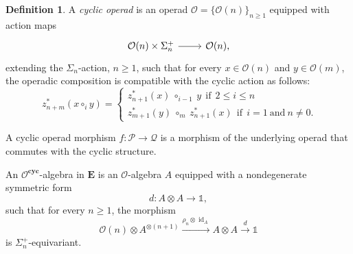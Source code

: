 \documentclass{amsart}
\newcommand{\bE}{\mathbf{E}}
\newcommand{\calO}{\mathcal{O}}
\newcommand{\calQ}{\mathcal{Q}}
\newcommand{\calP}{\mathcal{P}}
\newcommand{\cyc}{\mathbf{cyc}}
\newcommand{\id}{\operatorname{id}}
\newcommand{\End}{\operatorname{End}}
\newcommand{\Hom}{\operatorname{Hom}}
\newcommand{\lrar}{\ensuremath{\longrightarrow}}
\theoremstyle{definition}
\newtheorem{definition}[theorem]{Definition}%
\numberwithin{equation}{section}
\begin{document}


\begin{definition}\label{def: cyclic operad}
A \emph{cyclic operad} is an operad $\calO=\{\calO(n)\}_{n\geq 1}$ equipped with action maps \[\begin{tikzcd}\calO(n)\times\Sigma_{n}^{+}\arrow[r, ""]& \calO(n), \end{tikzcd}\] extending the $\Sigma_n$-action, $n\geq 1$, such that for every $x\in\calO(n)$ and $y\in\calO(m)$, the operadic composition is compatible with the cyclic action as follows: 
\begin{equation} ~\label{cylic_formula}
      z_{n+m}^*(x\circ_i y)  =  \begin{cases} z_{n+1}^*(x)\ \circ_{i-1}\ y \ \ \text{if} \ \ 2\leq i\leq n \\
      z_{m+1}^*(y) \ \circ_m \ z_{n+1}^*(x) \ \ \text{if} \ \ i=1 \ \text{and} \ n\not=0. 
      \end{cases}
\end{equation}   
\end{definition}
A cyclic operad morphism $f: \calP \lrar \calQ$ is a morphism of the underlying operad that commutes with the cyclic structure. 

An $\calO^{\cyc}$-algebra in $\bE$ is an $\calO$-algebra $A$ equipped with a nondegenerate symmetric form
\[
d:A\otimes A\to \mathbb{1},
\]
such that for every $n\geq 1$, the morphism
\[
\calO(n)\otimes A^{\otimes (n+1)}
\xrightarrow{\rho_n\otimes \id_A}
A\otimes A
\xrightarrow{d}
\mathbb{1}
\]
is $\Sigma_n^+$-equivariant.

\end{document}
